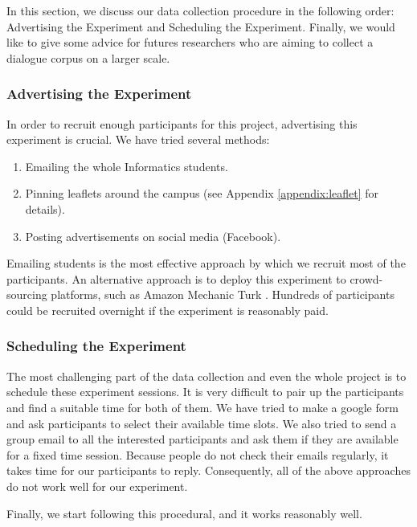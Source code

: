 \documentclass[bsc,frontabs,twoside,singlespacing,parskip,deptreport]{infthesis}     %
\begin{document}
In this section, we discuss our data collection procedure in the following order: Advertising the Experiment and Scheduling the Experiment. Finally, we would like to give some advice for futures researchers who are aiming to collect a dialogue corpus on a larger scale.

\subsubsection*{Advertising the Experiment}

In order to recruit enough participants for this project, advertising this experiment is crucial. We have tried several methods:

\begin{enumerate}
   \item Emailing the whole Informatics students.

   \item Pinning leaflets around the campus (see Appendix \ref{appendix:leaflet} for details). 
 
   \item Posting advertisements on social media (Facebook).
\end{enumerate}

Emailing students is the most effective approach by which we recruit most of the participants. An alternative approach is to deploy this experiment to crowd-sourcing platforms, such as Amazon Mechanic Turk \cite{mturk}. Hundreds of participants could be recruited overnight if the experiment is reasonably paid.


\subsubsection*{Scheduling the Experiment}

The most challenging part of the data collection and even the whole project is to schedule these experiment sessions. It is very difficult to pair up the participants and find a suitable time for both of them. We have tried to make a google form and ask participants to select their available time slots. We also tried to send a group email to all the interested participants and ask them if they are available for a fixed time session. Because people do not check their emails regularly, it takes time for our participants to reply. Consequently, all of the above approaches do not work well for our experiment.

Finally, we start following this procedural, and it works reasonably well.
\end{document}
